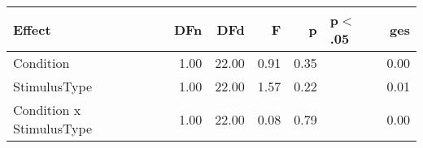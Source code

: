 \begin{table}[ht]
\centering
\begin{tabulary}{\textwidth}{lrrrrlr}
  \hline
Effect & DFn & DFd & F & p & p$<$.05 & ges \\ 
  \hline
Condition & 1.00 & 22.00 & 0.91 & 0.35 &  & 0.00 \\ 
  StimulusType & 1.00 & 22.00 & 1.57 & 0.22 &  & 0.01 \\ 
  Condition x StimulusType & 1.00 & 22.00 & 0.08 & 0.79 &  & 0.00 \\ 
   \hline
\end{tabulary}
\end{table}
